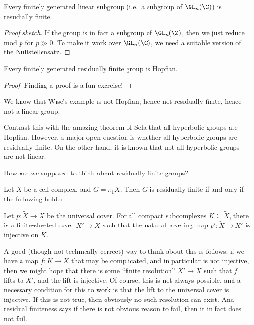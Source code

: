 \documentclass[a4paper]{article}
\begin{document}
\begin{thm}
  Every finitely generated linear subgroup (i.e.\ a subgroup of $\GL_n(\C)$) is resudially finite.
\end{thm}

\begin{proof}[Proof sketch]
  If the group is in fact a subgroup of $\GL_n(\Z)$, then we just reduce mod $p$ for $p \gg 0$. To make it work over $\GL_n(\C)$, we need a suitable version of the Nullstellensatz.
\end{proof}

\begin{thm}
  Every finitely generated residually finite group is Hopfian.
\end{thm}

\begin{proof}
  Finding a proof is a fun exercise!
\end{proof}
We know that Wise's example is not Hopfian, hence not residually finite, hence not a linear group.

Contrast this with the amazing theorem of Sela that all hyperbolic groups are Hopfian. However, a major open question is whether all hyperbolic groups are residually finite. On the other hand, it is known that not all hyperbolic groups are not linear.

How are we supposed to think about residually finite groups?

\begin{lemma}
  Let $X$ be a cell complex, and $G = \pi_1 X$. Then $G$ is residually finite if and only if the following holds:

  Let $p: \tilde{X} \to X$ be the universal cover. For all compact subcomplexes $K \subseteq \tilde{X}$, there is a finite-sheeted cover $X' \to X$ such that the natural covering map $p': \tilde{X} \to X'$ is injective on $K$.
\end{lemma}
A good (though not technically correct) way to think about this is follows: if we have a map $f: K \to X$ that may be complicated, and in particular is not injective, then we might hope that there is some ``finite resolution'' $X' \to X$ such that $f$ lifts to $X'$, and the lift is injective. Of course, this is not always possible, and a necessary condition for this to work is that the lift to the universal cover is injective. If this is not true, then obviously no such resolution can exist. And residual finiteness says if there is not obvious reason to fail, then it in fact does not fail.
\end{document}
